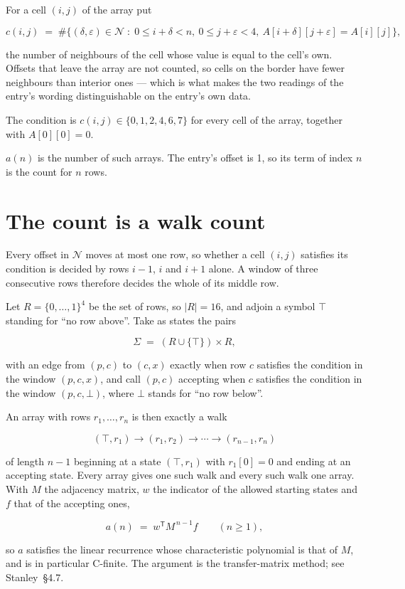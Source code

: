 \documentclass[11pt]{article}
\theoremstyle{definition}
\begin{document}
For a cell $(i,j)$ of the array put

\[c(i,j) \;=\; \#\bigl\{(\delta,\varepsilon)\in\mathcal{N} \;:\; 0\le i+\delta<n,\ 0\le j+\varepsilon<4,\ A[i+\delta][j+\varepsilon] = A[i][j]\bigr\},\]

the number of neighbours of the cell whose value is equal to the cell's own. Offsets that leave the array are not counted, so cells on the border have fewer neighbours than interior ones --- which is what makes the two readings of the entry's wording distinguishable on the entry's own data.

The condition is $c(i,j) \in \{0, 1, 2, 4, 6, 7\}$ for every cell of the array, together with $A[0][0]=0$.

$a(n)$ is the number of such arrays. The entry's offset is 1, so its term of index $n$ is the count for $n$ rows.

\section{The count is a walk count}

Every offset in $\mathcal{N}$ moves at most one row, so whether a cell $(i,j)$ satisfies its condition is decided by rows $i-1$, $i$ and $i+1$ alone. A window of three consecutive rows therefore decides the whole of its middle row.

Let $R = \{0,\dots,1\}^{4}$ be the set of rows, so $|R| = 16$, and adjoin a symbol $\top$ standing for ``no row above''. Take as states the pairs

\[\Sigma \;=\; (R \cup \{\top\}) \times R,\]

with an edge from $(p,c)$ to $(c,x)$ exactly when row $c$ satisfies the condition in the window $(p,c,x)$, and call $(p,c)$ accepting when $c$ satisfies the condition in the window $(p,c,\bot)$, where $\bot$ stands for ``no row below''.

An array with rows $r_1,\dots,r_n$ is then exactly a walk

\[(\top,r_1) \to (r_1,r_2) \to \cdots \to (r_{n-1},r_n)\]

of length $n-1$ beginning at a state $(\top,r_1)$ with $r_1[0]=0$ and ending at an accepting state. Every array gives one such walk and every such walk one array. With $M$ the adjacency matrix, $w$ the indicator of the allowed starting states and $f$ that of the accepting ones,

\[a(n) \;=\; w^{\mathsf T} M^{\,n-1} f \qquad (n \ge 1),\]

so $a$ satisfies the linear recurrence whose characteristic polynomial is that of $M$, and is in particular C-finite. The argument is the transfer-matrix method; see Stanley~\S4.7.
\end{document}
